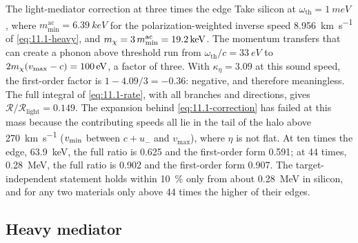 \begin{workedexample}{The light-mediator correction at three times the edge}\label{we:11-light}
Take silicon at $\omega_{\mathrm{th}} = \SI{1}{meV}$, where $m_{\mathrm{min}}^{\mathrm{ac}} = \SI{6.39}{keV}$ for the polarization-weighted inverse speed \SI{8.956}{km.s^{-1}} of \cref{eq:11.1-heavy}, and $m_{\chi} = 3\,m_{\mathrm{min}}^{\mathrm{ac}} = \SI{19.2}{keV}$. The momentum transfers that can create a phonon above threshold run from $\omega_{\mathrm{th}}/c = \SI{33}{eV}$ to $2m_{\chi}(v_{\mathrm{max}} - c) = \SI{100}{eV}$, a factor of three. With $\kappa_\eta = 3.09$ at this sound speed, the first-order factor is $1 - 4.09/3 = -0.36$: negative, and therefore meaningless. The full integral of \cref{eq:11.1-rate}, with all branches and directions, gives $\mathcal{R}/\mathcal{R}_{\mathrm{light}} = 0.149$. The expansion behind \cref{eq:11.1-correction} has failed at this mass because the contributing speeds all lie in the tail of the halo above \SI{270}{km.s^{-1}} ($v_{\mathrm{min}}$ between $c + u_-$ and $v_{\mathrm{max}}$), where $\eta$ is not flat. At ten times the edge, \SI{63.9}{keV}, the full ratio is 0.625 and the first-order form 0.591; at 44 times, \SI{0.28}{MeV}, the full ratio is 0.902 and the first-order form 0.907. The target-independent statement holds within \SI{10}{\percent} only from about \SI{0.28}{MeV} in silicon, and for any two materials only above 44 times the higher of their edges.
\end{workedexample}

\subsection{Heavy mediator}

